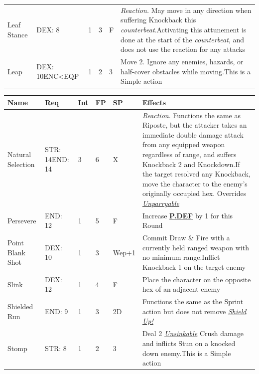 \documentclass[12pt]{article}
\newcommand{\refto}[1]{\hyperlink{#1}{\textbf{#1}}}
\newcommand{\reftoit}[1]{\hyperlink{#1}{\emph{#1}}}
\begin{document}
\begin{center}
\begin{tabularx}{\textwidth}{p{}p{}p{}p{}p{}p{}}
Leaf Stance & DEX: 8 & 1 & 3 & F & \emph{Reaction.} May move in any direction when suffering Knockback this \emph{counterbeat}.\newline Activating this attunement is done at the start of the \emph{counterbeat}, and does not use the reaction for any attacks\\
Leap & DEX: 10\newline ENC<EQP & 1 & 2 & 3 & Move 2. Ignore any enemies, hazards, or half-cover obstacles while moving.\newline This is a Simple action \\
\hline
\end{tabularx}
\end{center}

\pagebreak

\begin{center}
\begin{tabularx}{\textwidth}{p{}p{}p{}p{}p{}p{}}
\hline
\rowcolor{white} \textbf{Name} & \textbf{Req} & \textbf{Int} & \textbf{FP} & \textbf{SP} & \textbf{Effects}\setcounter{rownum}{0}\\
\hline
Natural Selection & STR: 14\newline END: 14 & 3 & 6 & X & \emph{Reaction}. Functions the same as Riposte, but the attacker takes an immediate double damage attack from any equipped weapon regardless of range, and suffers Knockback 2 and Knockdown.\newline If the target resolved any Knockback, move the character to the enemy’s originally occupied hex. \newline Overrides \reftoit{Unparryable} \\
Persevere & END: 12 & 1 & 5 & F & Increase \refto{P.DEF} by 1 for this Round \\
Point Blank Shot & DEX: 10 & 1 & 3 & Wep+1 & Commit Draw \& Fire with a currently held ranged weapon with no minimum range.\newline Inflict Knockback 1 on the target enemy\\
Slink & DEX: 12 & 1 & 4 & F & Place the character on the opposite hex of an adjacent enemy \\
Shielded Run & END: 9 & 1 & 3 & 2D & Functions the same as the Sprint action but does not remove \reftoit{Shield Up!}\\
Stomp & STR: 8 & 1 & 2 & 3 & Deal 2 \reftoit{Unsinkable} Crush damage and inflicts Stun on a knocked down enemy.\newline This is a Simple action\\

\end{tabularx}
\end{center}
\end{document}
